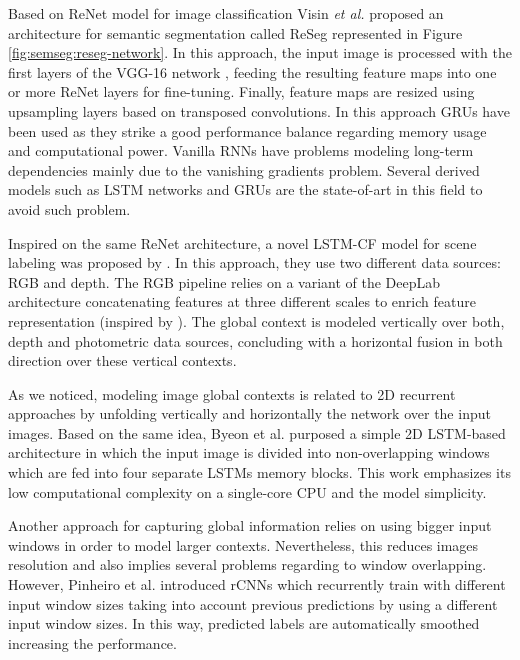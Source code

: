 Based on ReNet model for image classification Visin \emph{et al.}\cite{Visin2015} proposed an architecture for semantic segmentation called ReSeg \cite{Visin2016} represented in Figure \ref{fig:semseg:reseg-network}. In this approach, the input image is processed with the first layers of the \acs{VGG}-16 network \cite{Simonyan2014}, feeding the resulting feature maps into one or more ReNet layers for fine-tuning. Finally, feature maps are resized using upsampling layers based on transposed convolutions. In this approach \acp{GRU} have been used as they strike a good performance balance regarding memory usage and computational power. Vanilla \acsp{RNN} have problems modeling long-term dependencies mainly due to the vanishing gradients problem. Several derived models such as \ac{LSTM} networks \cite{Hochreiter1997} and \acp{GRU} \cite{Cho2014} are the state-of-art in this field to avoid such problem. 

Inspired on the same ReNet architecture, a novel \ac{LSTM-CF} model for scene labeling was proposed by \cite{ZhenLi2016}. In this approach, they use two different data sources: \acs{RGB} and depth. The \acs{RGB} pipeline relies on a variant of the DeepLab architecture \cite{Chen2014} concatenating features at three different scales to enrich feature representation (inspired by \cite{Li2016}). The global context is modeled vertically over both, depth and photometric data sources, concluding with a horizontal fusion in both direction over these vertical contexts.

As we noticed, modeling image global contexts is related to 2D recurrent approaches by unfolding vertically and horizontally the network over the input images. Based on the same idea, Byeon et al. \cite{Byeon2015} purposed a simple 2D \ac{LSTM}-based architecture in which the input image is divided into non-overlapping windows which are fed into four separate \acp{LSTM} memory blocks. This work emphasizes its low computational complexity on a single-core CPU and the model simplicity. 

Another approach for capturing global information relies on using bigger input windows in order to model larger contexts. Nevertheless, this reduces images resolution and also implies several problems regarding to window overlapping. However, Pinheiro et al. \cite{Pinheiro2014} introduced \acp{rCNN} which recurrently train with different input window sizes taking into account previous predictions by using a different input window sizes. In this way, predicted labels are automatically smoothed increasing the performance.

